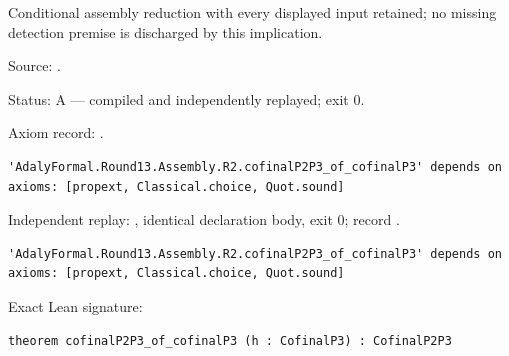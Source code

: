 \begin{theorem}[bp-581]
\label{bp-581}
\leanok
Conditional assembly reduction with every displayed input retained; no missing detection premise is discharged by this implication.

\par Source: \texttt{}.
\par Status: A — compiled and independently replayed; exit 0.
\par Axiom record: \texttt{}.
\begin{verbatim}
'AdalyFormal.Round13.Assembly.R2.cofinalP2P3_of_cofinalP3' depends on axioms: [propext, Classical.choice, Quot.sound]
\end{verbatim}
\par Independent replay: \texttt{}, identical declaration body, exit 0; record \texttt{}.
\begin{verbatim}
'AdalyFormal.Round13.Assembly.R2.cofinalP2P3_of_cofinalP3' depends on axioms: [propext, Classical.choice, Quot.sound]
\end{verbatim}
\par Exact Lean signature:
\begin{verbatim}
theorem cofinalP2P3_of_cofinalP3 (h : CofinalP3) : CofinalP2P3
\end{verbatim}
\end{theorem}

